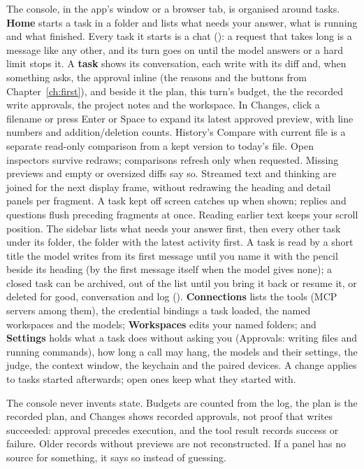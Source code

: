 The console, in the app's window or a browser tab, is organised around
tasks. \textbf{Home} starts a task in a folder and lists what needs your
answer, what is running and what finished. Every task it starts is a chat
(): a request that takes long is a message like any other, and its
turn goes on until the model answers or a hard limit stops it. A
\textbf{task} shows its conversation, each write with its diff and, when
something asks, the approval inline (the reasons and the buttons from
Chapter~\ref{ch:first}), and beside it the plan, this turn's budget, the
the recorded write approvals, the project notes and the workspace.
In Changes, click a filename or press Enter or Space to expand its latest
approved preview, with line numbers and addition/deletion counts. History's
Compare with current file is a separate read-only comparison from a kept
version to today's file. Open inspectors survive redraws; comparisons refresh
only when requested. Missing previews and empty or oversized diffs say so.
Streamed text and thinking are joined for the next display frame, without
redrawing the heading and detail panels per fragment. A task kept off screen
catches up when shown; replies and questions flush preceding fragments at
once. Reading earlier text keeps your scroll position.
The sidebar lists what needs your answer first, then every other task
under its folder, the folder with the latest activity first. A task is
read by a short title the model writes from its first message until you
name it with the pencil beside its heading (by the first message itself
when the model gives none); a closed task can be archived, out of the list until you bring
it back or resume it, or deleted for good, conversation and log
().
\textbf{Connections} lists the tools (MCP servers among them), the
credential bindings a task loaded, the named workspaces and the models;
\textbf{Workspaces} edits your named folders; and \textbf{Settings} holds
what a task does without asking you (Approvals: writing files and running
commands), how long a call may hang, the models and their
settings, the judge, the context window, the keychain and the paired
devices. A change applies to tasks started afterwards; open ones keep what
they started with.

\begin{tip}
The console never invents state. Budgets are counted from the log, the plan
is the recorded plan, and Changes shows recorded approvals, not proof that
writes succeeded: approval precedes execution, and the tool result records
success or failure. Older records without previews are not reconstructed. If a panel has no
source for something, it says so instead of guessing.
\end{tip}

